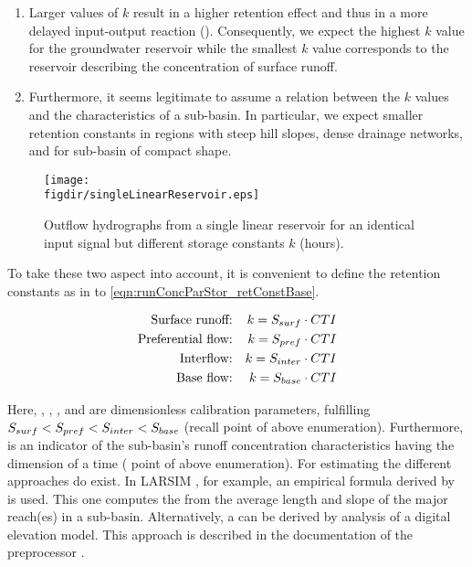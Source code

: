 \begin{enumerate}
  \item Larger values of $k$ result in a higher retention effect and thus in a more delayed input-output reaction (). Consequently, we expect the highest $k$ value for the groundwater reservoir while the smallest $k$ value corresponds to the reservoir describing the concentration of surface runoff.
  \item Furthermore, it seems legitimate to assume a relation between the $k$ values and the characteristics of a sub-basin. In particular, we expect smaller retention constants in regions with steep hill slopes, dense drainage networks, and for sub-basin of compact shape.
\end{enumerate}

\begin{figure}
  \texttt{[image: \\figdir/singleLinearReservoir.eps]}
  \caption{Outflow hydrographs from a single linear reservoir for an identical input signal but different storage constants $k$ (hours). \label{fig:runConcParStor_singleLinReserv}}
\end{figure}

To take these two aspect into account, it is convenient to define the retention constants as in  to \ref{eqn:runConcParStor_retConstBase}.

\begin{align}
\text{Surface runoff:} && k = {S_{surf}} \cdot {CTI} \label{eqn:runConcParStor_retConstSurf} \\
\text{Preferential flow:} && k = {S_{pref}} \cdot {CTI} \label{eqn:runConcParStor_retConstPref} \\
\text{Interflow:} && k = {S_{inter}} \cdot {CTI} \label{eqn:runConcParStor_retConstInter} \\
\text{Base flow:} && k = {S_{base}} \cdot {CTI} \label{eqn:runConcParStor_retConstBase}
\end{align}

Here, \strSurf, \strPref, \strInter, and \strBase{} are dimensionless calibration parameters, fulfilling ${S_{surf}} < {S_{pref}} < {S_{inter}} < {S_{base}}$ (recall \first{} point of above enumeration). Furthermore, \concTimeIndex{} is an indicator of the sub-basin's runoff concentration characteristics having the dimension of a time (\second{} point of above enumeration). For estimating the \concTimeIndex{} different approaches do exist. In LARSIM \citep{Ludwig2006}, for example, an empirical formula derived by \citet{Kirpich1940} is used. This one computes the \concTimeIndex{} from the average length and slope of the major reach(es) in a sub-basin. Alternatively, a \concTimeIndex{} can be derived by analysis of a digital elevation model. This approach is described in the documentation of the  preprocessor \citep[see][]{Echse-Tools-Doc}.

